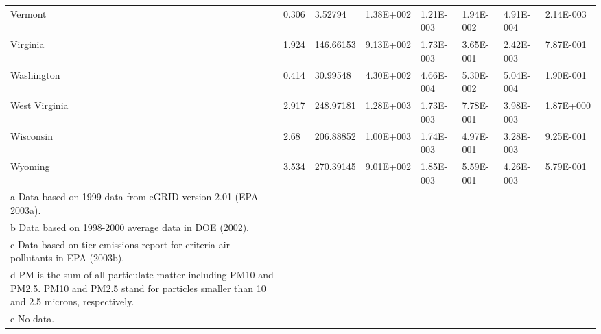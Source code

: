 \begin{longtable}[c]{p{0.75in}p{0.75in}p{0.75in}p{0.75in}p{0.75in}p{0.75in}p{0.75in}p{0.75in}}
Vermont & 0.306 & 3.52794 & 1.38E+002 & 1.21E-003 & 1.94E-002 & 4.91E-004 & 2.14E-003 \tabularnewline
Virginia & 1.924 & 146.66153 & 9.13E+002 & 1.73E-003 & 3.65E-001 & 2.42E-003 & 7.87E-001 \tabularnewline
Washington & 0.414 & 30.99548 & 4.30E+002 & 4.66E-004 & 5.30E-002 & 5.04E-004 & 1.90E-001 \tabularnewline
West Virginia & 2.917 & 248.97181 & 1.28E+003 & 1.73E-003 & 7.78E-001 & 3.98E-003 & 1.87E+000 \tabularnewline
Wisconsin & 2.68 & 206.88852 & 1.00E+003 & 1.74E-003 & 4.97E-001 & 3.28E-003 & 9.25E-001 \tabularnewline
Wyoming & 3.534 & 270.39145 & 9.01E+002 & 1.85E-003 & 5.59E-001 & 4.26E-003 & 5.79E-001 \tabularnewline
a Data based on 1999 data from eGRID version 2.01 (EPA 2003a). \tabularnewline
b Data based on 1998-2000 average data in DOE (2002). \tabularnewline
c Data based on tier emissions report for criteria air pollutants in EPA (2003b). \tabularnewline
d PM is the sum of all particulate matter including PM10 and PM2.5. PM10 and PM2.5 stand for particles smaller than 10 and 2.5 microns, respectively. \tabularnewline
e No data. \tabularnewline
\bottomrule
\end{longtable}

